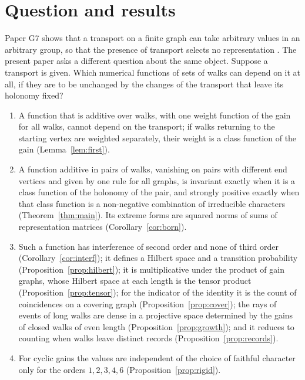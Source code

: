 \section{Question and results}

Paper G7 shows that a transport on a finite graph can take arbitrary values in an arbitrary group, so that the presence of transport selects no representation \cite{g7}. The present paper asks a different question about the same object. Suppose a transport is given. Which numerical functions of sets of walks can depend on it at all, if they are to be unchanged by the changes of the transport that leave its holonomy fixed?

\begin{enumerate}[label=(\roman*)]
\item A function that is additive over walks, with one weight function of the gain for all walks, cannot depend on the transport; if walks returning to the starting vertex are weighted separately, their weight is a class function of the gain (Lemma~\ref{lem:first}).
\item A function additive in pairs of walks, vanishing on pairs with different end vertices and given by one rule for all graphs, is invariant exactly when it is a class function of the holonomy of the pair, and strongly positive exactly when that class function is a non-negative combination of irreducible characters (Theorem~\ref{thm:main}). Its extreme forms are squared norms of sums of representation matrices (Corollary~\ref{cor:born}).
\item Such a function has interference of second order and none of third order (Corollary~\ref{cor:interf}); it defines a Hilbert space and a transition probability (Proposition~\ref{prop:hilbert}); it is multiplicative under the product of gain graphs, whose Hilbert space at each length is the tensor product (Proposition~\ref{prop:tensor}); for the indicator of the identity it is the count of coincidences on a covering graph (Proposition~\ref{prop:cover}); the rays of events of long walks are dense in a projective space determined by the gains of closed walks of even length (Proposition~\ref{prop:growth}); and it reduces to counting when walks leave distinct records (Proposition~\ref{prop:records}).
\item For cyclic gains the values are independent of the choice of faithful character only for the orders $1,2,3,4,6$ (Proposition~\ref{prop:rigid}).
\end{enumerate}

